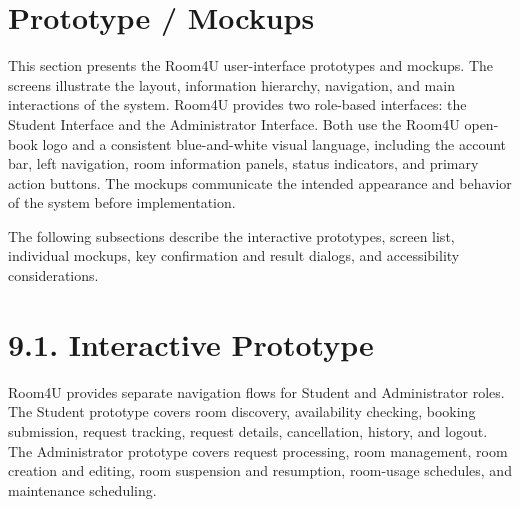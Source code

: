 
\section{Prototype / Mockups}

This section presents the Room4U user-interface prototypes and mockups.
The screens illustrate the layout, information hierarchy, navigation,
and main interactions of the system. Room4U provides two role-based
interfaces: the Student Interface and the Administrator Interface. Both
use the Room4U open-book logo and a consistent blue-and-white visual
language, including the account bar, left navigation, room information
panels, status indicators, and primary action buttons. The mockups
communicate the intended appearance and behavior of the system before
implementation.

The following subsections describe the interactive prototypes, screen
list, individual mockups, key confirmation and result dialogs, and
accessibility considerations.

\section*{9.1. Interactive Prototype}\label{interactive-prototype}

Room4U provides separate navigation flows for Student and Administrator
roles. The Student prototype covers room discovery, availability
checking, booking submission, request tracking, request details,
cancellation, history, and logout. The Administrator prototype covers
request processing, room management, room creation and editing, room
suspension and resumption, room-usage schedules, and maintenance
scheduling.

